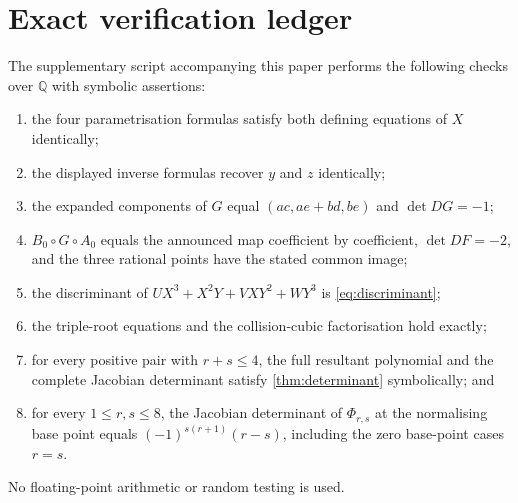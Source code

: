 \documentclass[11pt,reqno]{amsart}
\theoremstyle{definition}
\theoremstyle{remark}
\newcommand{\Q}{\mathbb Q}
\begin{document}
\section{Exact verification ledger}\label{app:verification}

The supplementary script accompanying this paper performs the following
checks over $\Q$ with symbolic assertions:
\begin{enumerate}[label=(\roman*),leftmargin=2.1em]
\item the four parametrisation formulas satisfy both defining equations
of $X$ identically;
\item the displayed inverse formulas recover $y$ and $z$ identically;
\item the expanded components of $G$ equal $(ac,ae+bd,be)$ and
$\det DG=-1$;
\item $B_0\circ G\circ A_0$ equals the announced map coefficient by
coefficient, $\det DF=-2$, and the three rational points have the stated
common image;
\item the discriminant of
$UX^3+X^2Y+VXY^2+WY^3$ is
\eqref{eq:discriminant};
\item the triple-root equations and the collision-cubic factorisation
hold exactly;
\item for every positive pair with $r+s\le4$, the full resultant
polynomial and the complete Jacobian determinant satisfy
\cref{thm:determinant} symbolically; and
\item for every $1\le r,s\le8$, the Jacobian determinant of
$\Phi_{r,s}$ at the normalising base point equals
$(-1)^{s(r+1)}(r-s)$, including the zero base-point cases $r=s$.
\end{enumerate}
No floating-point arithmetic or random testing is used.
\end{document}
